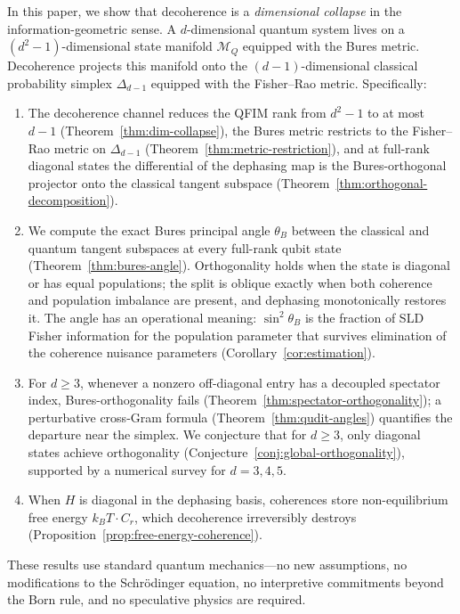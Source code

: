 \documentclass[12pt,a4paper]{article}
\theoremstyle{definition}
\theoremstyle{remark}
\begin{document}
In this paper, we show that decoherence is a \emph{dimensional collapse} in the information-geometric sense. A $d$-dimensional quantum system lives on a $(d^2-1)$-dimensional state manifold $\mathcal{M}_Q$ equipped with the Bures metric. Decoherence projects this manifold onto the $(d-1)$-dimensional classical probability simplex $\Delta_{d-1}$ equipped with the Fisher--Rao metric. Specifically:
\begin{enumerate}
\item[\emph{(Background.)}] The decoherence channel reduces the QFIM rank from $d^2-1$ to at most $d-1$ (Theorem~\ref{thm:dim-collapse}), the Bures metric restricts to the Fisher--Rao metric on $\Delta_{d-1}$ (Theorem~\ref{thm:metric-restriction}), and at full-rank diagonal states the differential of the dephasing map is the Bures-orthogonal projector onto the classical tangent subspace (Theorem~\ref{thm:orthogonal-decomposition}).
\item[\emph{(Main result.)}] We compute the exact Bures principal angle $\theta_B$ between the classical and quantum tangent subspaces at every full-rank qubit state (Theorem~\ref{thm:bures-angle}).  Orthogonality holds when the state is diagonal or has equal populations; the split is oblique exactly when both coherence and population imbalance are present, and dephasing monotonically restores it.  The angle has an operational meaning: $\sin^2\theta_B$ is the fraction of SLD Fisher information for the population parameter that survives elimination of the coherence nuisance parameters (Corollary~\ref{cor:estimation}).
\item[\emph{(Generalization.)}] For $d \geq 3$, whenever a nonzero off-diagonal entry has a decoupled spectator index, Bures-orthogonality fails (Theorem~\ref{thm:spectator-orthogonality}); a perturbative cross-Gram formula (Theorem~\ref{thm:qudit-angles}) quantifies the departure near the simplex.  We conjecture that for $d \geq 3$, only diagonal states achieve orthogonality (Conjecture~\ref{conj:global-orthogonality}), supported by a numerical survey for $d = 3, 4, 5$.
\item[\emph{(Thermodynamics.)}] When $H$ is diagonal in the dephasing basis, coherences store non-equilibrium free energy $k_B T \cdot C_r$, which decoherence irreversibly destroys (Proposition~\ref{prop:free-energy-coherence}).
\end{enumerate}
These results use standard quantum mechanics---no new assumptions, no modifications to the Schr\"odinger equation, no interpretive commitments beyond the Born rule, and no speculative physics are required.
\end{document}
